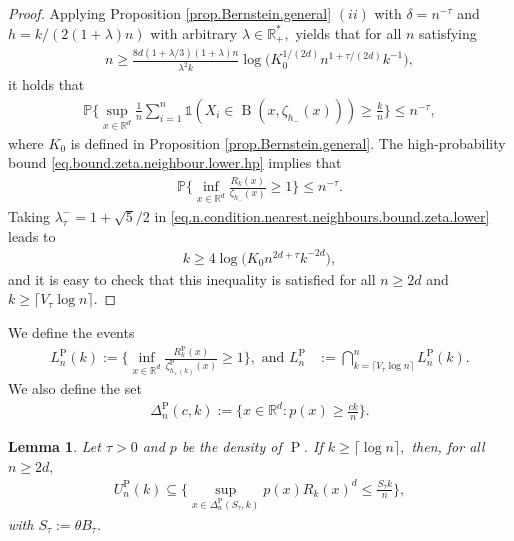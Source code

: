 \documentclass[10pt]{article}
\newcommand{\PP}{\mathbb{P}}
\newcommand{\RR}{\mathbb{R}}
\newcommand{\B}{\operatorname{B}}
\renewcommand{\P}{\operatorname{P}}
\newtheorem{lemma}[theorem]{Lemma}
\begin{document}
\begin{proof}
    Applying Proposition \ref{prop.Bernstein.general} $(ii)$ with $\delta = n^{-\tau}$ and $h = k/(2(1 + \lambda)n)$ with arbitrary $\lambda \in \RR_+^*,$ yields that for all $n$ satisfying
    \begin{align}
        \label{eq.n.condition.nearest.neighbours.bound.zeta.lower}
        n \geq \frac{8d(1 + \lambda/3)(1 + \lambda)n}{\lambda^2k}\log\Big(K_0^{1/(2d)}n^{1 + \tau/(2d)}k^{-1}\Big),
    \end{align}
    it holds that
    \begin{align}
        \label{eq.bound.zeta.neighbour.lower.hp}
        \PP\Bigg\{\sup_{x \in \RR^d}\frac{1}{n}\sum_{i=1}^n \mathds{1}(X_i \in \B(x, \zeta_{h_-}(x))) \geq \frac kn\Bigg\} \leq n^{-\tau},
    \end{align}
    where $K_0$ is defined in Proposition \ref{prop.Bernstein.general}. The high-probability bound \eqref{eq.bound.zeta.neighbour.lower.hp} implies that
    \begin{align*}
        \PP\Bigg\{\inf_{x \in \RR^d}\frac{R_k(x)}{\zeta_{h_-}(x)} \geq 1\Bigg\} \leq n^{-\tau}.
    \end{align*}
    Taking $\lambda_\tau^- = 1 + \sqrt{5}/2$ in \eqref{eq.n.condition.nearest.neighbours.bound.zeta.lower} leads to
    \begin{align*}
        k \geq 4\log\big(K_0n^{2d + \tau}k^{-2d}\big),
    \end{align*}
    and it is easy to check that this inequality is satisfied for all $n \geq 2d$ and $k \geq \lceil V_\tau \log n\rceil.$
\end{proof}
We define the events
\begin{align*}
    L_n^{\P}(k) := \Bigg\{\inf_{x \in \RR^d} \frac{R_k^{\P}(x)}{\zeta^{\P}_{h_+(k)}(x)}\geq 1\Bigg\},\text{ and }L_n^{\P} &:= \bigcap_{k= \lceil V_\tau\log n\rceil}^n L_n^{\P}(k).
\end{align*}
We also define the set
\begin{align*}
    \Delta_n^{\P}(c, k) := \bigg\{x \in \RR^d: p(x) \geq \frac{ck}{n}\bigg\}.
\end{align*}

\begin{lemma}
    \label{lem.bound.neighbours.density}
    Let $\tau > 0$ and $p$ be the density of $\P.$ If $k \geq \lceil\log n\rceil,$ then, for all $n \geq 2d,$
    \begin{align*}
         U_n^{\P}(k) \subseteq \Bigg\{\sup_{x \in \Delta_n^{\P}(S_{\tau}, k)}p(x)R_k(x)^d \leq \frac{S_\tau k}{n}\Bigg\},
    \end{align*}
    with $S_{\tau} := \theta B_\tau.$
\end{lemma}
\end{document}

